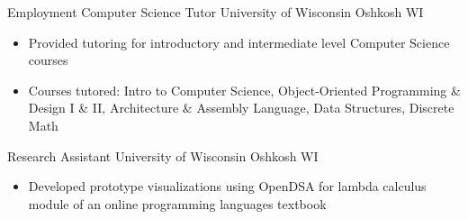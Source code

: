 \cventry
    {Employment}
    {Computer Science Tutor}
    {University of Wisconsin}
    {Oshkosh}
    {WI}
    {\begin{itemize}
        \item Provided tutoring for introductory and intermediate level Computer Science courses
        \item Courses tutored: Intro to Computer Science, Object-Oriented Programming \& Design I \&
        II, Architecture \& Assembly Language, Data Structures, Discrete Math
    \end{itemize}}
\cventry
    {}
    {Research Assistant} {University of Wisconsin}
    {Oshkosh}
    {WI}
    {\begin{itemize}
        \item Developed prototype visualizations using OpenDSA for lambda calculus module of an
        online programming languages textbook
    \end{itemize}}